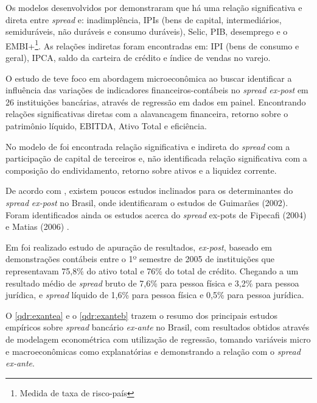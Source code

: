 \documentclass[
  12pt,
  12pt,
  openright,
  oneside,
  a4paper,
  chapter=TITLE,
  section=TITLE,
  subsection=TITLE,
  subsubsection=TITLE,
  english,
  portugues,
  sumario=tradicional]{abntex2}
\begin{document}
Os modelos desenvolvidos por \textcite{durigan:2018} demonstraram que há uma relação significativa e direta entre \emph{spread} e: inadimplência, IPIs (bens de capital, intermediários, semiduráveis, não duráveis e consumo duráveis), Selic, PIB, desemprego e o EMBI+\footnote{Medida de taxa de risco-país}. As relações indiretas foram encontradas em: IPI (bens de consumo e geral), IPCA, saldo da carteira de crédito e índice de vendas no varejo.

O estudo de \textcite{timotio:2018} teve foco em abordagem microeconômica ao buscar identificar a influência das variações de indicadores financeiros-contábeis no \emph{spread ex-post} em 26 instituições bancárias, através de regressão em dados em painel. Encontrando relações significativas diretas com a alavancagem financeira, retorno sobre o patrimônio líquido, EBITDA, Ativo Total e eficiência.

No modelo de \textcite{timotio:2018} foi encontrada relação significativa e indireta do \emph{spread} com a participação de capital de terceiros e, não identificada relação significativa com a composição do endividamento, retorno sobre ativos e a liquidez corrente.

De acordo com \textcite{durigan:2018, dantas:2012}, existem poucos estudos inclinados para os determinantes do \emph{spread} \emph{ex-post} no Brasil, onde identificaram o estudos de Guimarães (2002). Foram identificados ainda os estudos acerca do \emph{spread} ex-pots de Fipecafi (2004) \cite{dantas:2012} e Matias (2006) \cite{leal:2006}.

Em \textcite{fipecafi:2005} foi realizado estudo de apuração de resultados, \emph{ex-post}, baseado em demonstrações contábeis entre o 1º semestre de 2005 de instituições que representavam 75,8\% do ativo total e 76\% do total de crédito. Chegando a um resultado médio de \emph{spread} bruto de 7,6\% para pessoa física e 3,2\% para pessoa jurídica, e \emph{spread} líquido de 1,6\% para pessoa física e 0,5\% para pessoa jurídica.

O \autoref{qdr:exantea} e o \autoref{qdr:exanteb} trazem o resumo dos principais estudos empíricos sobre \emph{spread} bancário \emph{ex-ante} no Brasil, com resultados obtidos através de modelagem econométrica com utilização de regressão, tomando variáveis micro e macroeconômicas como explanatórias e demonstrando a relação com o \emph{spread ex-ante}.
\end{document}
